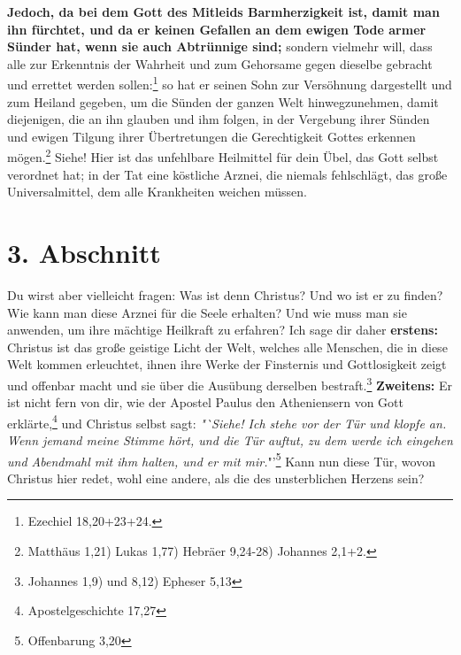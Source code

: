 \label{ref:02_02_kein_gefallen_am_tod}
\textbf{Jedoch, da bei dem Gott des Mitleids Barmherzigkeit ist, damit man ihn
fürchtet, und da er keinen Gefallen an dem ewigen Tode armer
Sünder hat, wenn
sie auch Abtrünnige sind;} sondern vielmehr will, dass alle zur Erkenntnis der
Wahrheit und zum Gehorsame gegen dieselbe gebracht und errettet werden
sollen:\footnote{Ezechiel 18,20+23+24.}
 so hat er seinen Sohn zur
Versöhnung
dargestellt und zum Heiland gegeben, um die Sünden der ganzen Welt
hinwegzunehmen, damit diejenigen, die an ihn glauben und ihm folgen, in der
Vergebung ihrer Sünden und ewigen Tilgung ihrer Übertretungen die
Gerechtigkeit Gottes erkennen mögen.\footnote{Matthäus 1,21) Lukas 1,77) Hebräer
9,24-28) Johannes 2,1+2.}
Siehe! Hier ist das unfehlbare Heilmittel für dein
Übel, das Gott selbst verordnet hat; in der Tat eine köstliche Arznei, die
niemals fehlschlägt, das große Universalmittel, dem alle Krankheiten weichen
müssen.

\section{3. Abschnitt}  \label{kap2_ab3}

\label{ref:02_03_gott_in_jedem}
Du wirst aber vielleicht fragen: Was ist denn Christus? Und wo ist er zu finden?
Wie kann man diese Arznei für die Seele erhalten? Und wie muss man sie anwenden,
um ihre mächtige Heilkraft zu erfahren? Ich sage dir daher \textbf{erstens:}
Christus ist das große geistige Licht der Welt, welches alle Menschen, die in
diese Welt kommen erleuchtet, ihnen ihre Werke der Finsternis und Gottlosigkeit
zeigt und offenbar macht und sie über die Ausübung derselben
bestraft.\footnote{Johannes 1,9) und 8,12) Epheser 5,13}
\textbf{Zweitens:} Er ist nicht fern von dir, wie der
Apostel Paulus den Atheniensern von Gott erklärte,\footnote{Apostelgeschichte
17,27}
und Christus selbst sagt:
\textit{"`Siehe! Ich stehe vor der Tür und klopfe an.
Wenn jemand meine Stimme hört, und die Tür auftut, zu dem werde ich eingehen
und Abendmahl mit ihm halten, und er mit mir.}"'\footnote{Offenbarung 3,20}
Kann
nun diese Tür, wovon Christus hier redet, wohl eine andere, als die des
unsterblichen Herzens sein?

